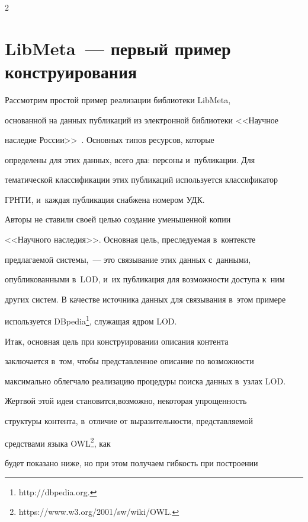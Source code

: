 \begin{multicols}{2}
     

\section{LibMeta~--- первый пример конструирования}







     Рассмотрим простой пример реализации биб\-лио\-те\-ки LibMeta, 

основанной на данных публикаций из электронной библиотеки <<Научное 

наследие России>>~\cite{7-ser}. Основных типов ресурсов, которые 

определены для этих данных, всего два: персоны и~публикации. Для 

тематической классификации этих публикаций используется классификатор 

\mbox{ГРНТИ}, и~каждая публикация снабжена номером УДК.

     

     Авторы не ставили своей целью создание уменьшенной копии 

<<Научного наследия>>. Основная цель, преследуемая в~контексте 

предлагаемой сис\-те\-мы,~--- это связывание этих данных с~данными, 

опубликованными в~LOD, и~их публикация для возможности доступа к~ним 

других систем. В качестве источника данных для связывания в~этом примере 

используется DBpedia\footnote{{\sf http://dbpedia.org.}}, служащая ядром LOD. 

     

     Итак, основная цель при конструировании описа\-ния контента 

заключается в~том, чтобы пред\-став\-лен\-ное описание по возможности 

макси\-мально облегчало реализацию процедуры поиска данных в~узлах LOD. 

Жертвой этой идеи становится,\linebreak возможно, некоторая упро\-щен\-ность 

структуры контента, в~отличие от выразительности, пред\-став\-ля\-емой 

средствами языка OWL\footnote{{\sf https://www.w3.org/2001/sw/wiki/OWL.}}, как 

будет показано ниже, но при этом получаем гибкость при по\-стро\-ении 


\end{multicols}
